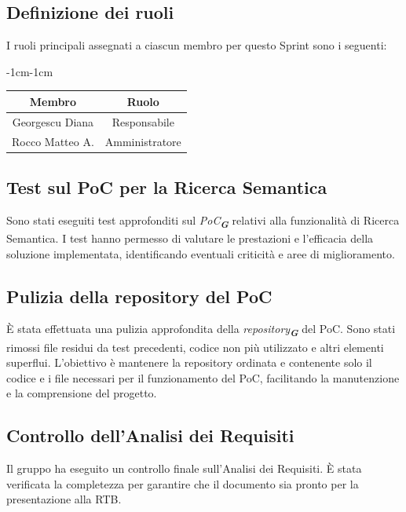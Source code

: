 \documentclass[a4paper,12pt]{article}
\newcommand{\glossario}[1]{\textit{#1}\textsubscript{\textbf{\textit{\textcolor{lightblack}{G}}}}}
\begin{document}
\subsection{Definizione dei ruoli}
I ruoli principali assegnati a ciascun membro per questo Sprint sono i seguenti:
\begin{table}[H]
    \begin{adjustwidth}{-1cm}{-1cm}
    \centering
\begin{tabular}{|c|c|}
    \hline
    \textbf{Membro} & \textbf{Ruolo} \\
    \hline
    Georgescu Diana & Responsabile \\
    \hline
    Rocco Matteo A. & Amministratore \\
    \hline
\end{tabular}
    \end{adjustwidth}
\end{table}

\subsection{Test sul PoC per la Ricerca Semantica}
Sono stati eseguiti test approfonditi sul \glossario{PoC} relativi alla funzionalità di Ricerca Semantica. I test hanno permesso di valutare le prestazioni e l'efficacia della soluzione implementata, identificando eventuali criticità e aree di miglioramento.\\

\subsection{Pulizia della repository del PoC}
È stata effettuata una pulizia approfondita della \glossario{repository} del PoC. Sono stati rimossi file residui da test precedenti, codice non più utilizzato e altri elementi superflui. L'obiettivo è mantenere la repository ordinata e contenente solo il codice e i file necessari per il funzionamento del PoC, facilitando la manutenzione e la comprensione del progetto.\\

\subsection{Controllo dell'Analisi dei Requisiti}
Il gruppo ha eseguito un controllo finale sull'Analisi dei Requisiti. È stata verificata la completezza per garantire che il documento sia pronto per la presentazione alla RTB.\\
\end{document}
